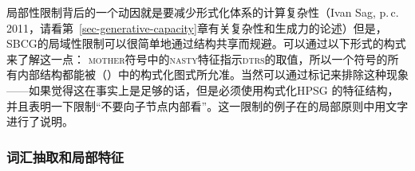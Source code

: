 局部性限制背后的一个动因就是要减少形式化体系的计算复杂性（Ivan Sag, p.\,c.\,2011，请看第~\ref{sec-generative-capacity}章有关复杂性和生成力的论述）但是，SBCG的局域性限制可以很简单地通过结构共享而规避\citep[\S~9.6.1]{MuellerGTBuch2}。可以通过以下形式的构式来了解这一点：
\ea
{}
\z
\textsc{mother}符号中的\textsc{nasty}特征指示\textsc{dtrs}的取值，所以一个符号的所有内部结构都能被（）中的构式化图式所允准。当然可以通过标记来排除这种现象——如果觉得这在事实上是足够的话，但是必须使用构式化HPSG \citep{Sag97a}的特征结构，并且表明一下限制“不要向子节点内部看”。这一限制的例子在\citet[--144]{ps}的局部原则中用文字进行了说明。

\subsubsection{词汇抽取和局部特征}
\label{sec-sbcg-local-feature}

